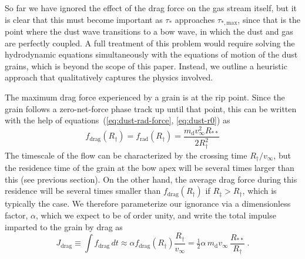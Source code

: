 \message{ !name(dusty-bow-wave.tex)}\documentclass[useAMS, usenatbib, a4paper]{mnras}
\newcommand{\grain}{\ensuremath{_{\text{d}}}}
\newcommand\drag{\ensuremath{_{\text{drag}}}}
\newcommand\rad{\ensuremath{_{\text{rad}}}}
\newcommand\starstar{\ensuremath{_{**}}}
\begin{document}
So far we have ignored the effect of the drag force on the gas stream
itself, but it is clear that this must become important as \(\tau_*\)
approaches \(\tau_{*,\text{max}}\), since that is the point where the
dust wave transitions to a bow wave, in which the dust and gas are
perfectly coupled.  A full treatment of this problem would require
solving the hydrodynamic equations simultaneously with the equations
of motion of the dust grains, which is beyond the scope of this paper.
Instead, we outline a heuristic approach that qualitatively captures
the physics involved.

The maximum drag force experienced by a grain is at the rip point.
Since the grain follows a zero-net-force phase track up until that
point, this can be written with the help of
equations~(\ref{eq:dust-rad-force}, \ref{eq:dust-r0}) as
\begin{equation}
  \label{eq:fdrag-max}
  f\drag (R_\dag) = f\rad(R_\dag) =   \frac{m\grain v_\infty^2 R\starstar}{ 2 R_\dag^2} 
\end{equation}
The timescale of the flow can be characterized by the crossing time
\(R_\dag / v_\infty\), but the residence time of the grain at the bow apex
will be several times larger than this (see previous section).  On the
other hand, the average drag force during this residence will be
several times smaller than \(f\drag (R_\dag)\) if
\(R_\ddag > R_\dag\), which is typically the case.  We therefore parameterize
our ignorance via a dimensionless factor, \(\alpha\), which we expect to be
of order unity, and write the total impulse imparted to the grain by
drag as
\begin{equation}
  \label{eq:grain-impulse}
  J\drag \equiv \int \!f\drag \, dt \approx \alpha f\drag (R_\dag) \frac{R_\dag}{v_\infty}
  = \tfrac12 \alpha \, m\grain v_\infty \, \frac{R\starstar}{R_\dag} \ .
\end{equation}
\end{document}
